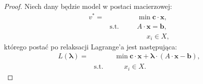 \begin{proof}
	Niech dany będzie model w postaci macierzowej:
	\begin{subequations}
		\begin{alignat}{4}
		v^{\ast} = & & & \min \textbf{c} \cdot \textbf{x}\text{,} \\
		& \text{s.t.} & \quad & A \cdot \textbf{x} = \textbf{b},\\
		& & & \phantom{\sum} x_{i} \in X\text{,}
		\end{alignat}\label{mod:relax1}
	\end{subequations}
	którego postać po relaksacji Lagrange'a jest następująca:
	\begin{subequations}
		\begin{alignat}{4}
		L \left( \boldsymbol{\lambda} \right) = & & & \min \textbf{c} \cdot \textbf{x} + \boldsymbol{\lambda} \cdot \left( A \cdot \textbf{x} - \textbf{b} \right)\text{,} \\
		& \text{s.t.} & & \phantom{\sum} x_{i} \in X\text{.}
		\end{alignat}\label{mod:relax2}
	\end{subequations}
	

\end{proof}
